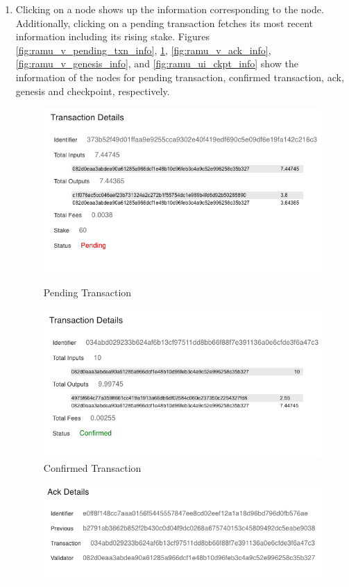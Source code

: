 \begin{enumerate}
	\item Clicking on a node shows up the information corresponding to the node. Additionally, clicking on a pending transaction fetches its most recent information including its rising stake. Figures \ref{fig:ramu_v_pending_txn_info}, \ref{fig:ramu_v_confirmed_txn_info}, \ref{fig:ramu_v_ack_info}, \ref{fig:ramu_v_genesis_info}, and \ref{fig:ramu_ui_ckpt_info} show the information of the nodes for pending transaction, confirmed transaction, ack, genesis and checkpoint, respectively.
	\begin{figure}[!htb]
		  \includegraphics[width=\linewidth]{figures/images/ramu/v_pending_txn_info.png}
		  \caption{Pending Transaction}
		\label{fig:ramu_v_pending_txn_info}
		\endminipage
		\hfill
		  \includegraphics[width=\linewidth]{figures/images/ramu/v_confirmed_txn_info.png}
		  \caption{Confirmed Transaction}
		\label{fig:ramu_v_confirmed_txn_info}
		\endminipage
	\end{figure}
	\begin{figure}[!htb]
		  \includegraphics[width=\linewidth]{figures/images/ramu/v_ack_info.png}

\end{figure}
\end{enumerate}
